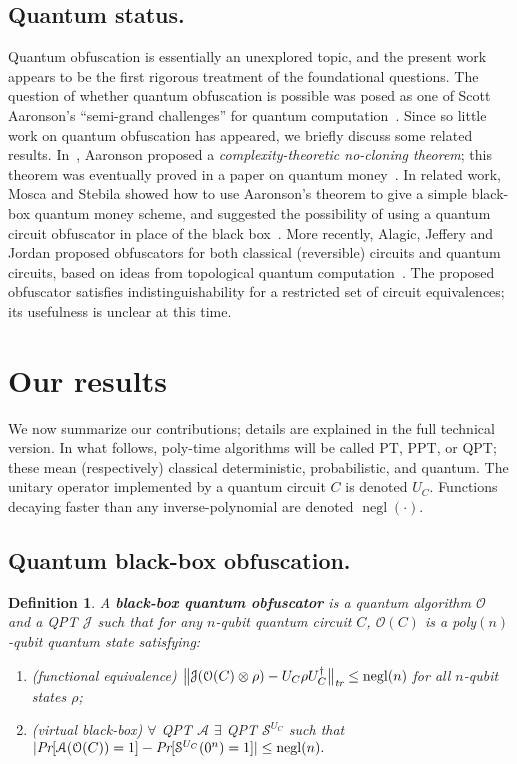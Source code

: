 \documentclass[11pt]{amsart}
\numberwithin{equation}{section}
\newtheorem{definition}{Definition}
\newcommand{\opn}{\operatorname}
\newcommand{\algo}{\mathcal}
\newcommand{\negl}{\opn{negl}}
\begin{document}
\subsection{Quantum status.} Quantum obfuscation is essentially an unexplored topic, and the present work appears to be the first rigorous treatment of the foundational questions. The question of whether quantum obfuscation is possible was posed as one of Scott Aaronson's ``semi-grand challenges'' for quantum computation~\cite{Aar05}. Since so little work on quantum obfuscation has appeared, we briefly discuss some related results. In~\cite{Aar09}, Aaronson proposed a \emph{complexity-theoretic no-cloning theorem}; this theorem was eventually proved in a paper on quantum money~\cite{AC12}. In related work, Mosca and Stebila showed how to use Aaronson's theorem to give a simple black-box quantum money scheme, and suggested the possibility of using a quantum circuit obfuscator in place of the black box~\cite{MS10}. More recently, Alagic, Jeffery and Jordan proposed obfuscators for both classical (reversible) circuits and quantum circuits, based on ideas from topological quantum computation~\cite{ASS14}. The proposed obfuscator satisfies indistinguishability for a restricted set of circuit equivalences; its usefulness is unclear at this time.

\section{Our results}\label{sec:intro}

We now summarize our contributions; details are explained in the full technical version. In what follows, poly-time algorithms will be called PT, PPT, or QPT; these mean (respectively) classical deterministic, probabilistic, and quantum. The unitary operator implemented by a quantum circuit $C$ is denoted $U_C$. Functions decaying faster than any inverse-polynomial are denoted $\negl(\cdot)$.

\subsection{Quantum black-box obfuscation.} 

\begin{definition}\label{def:vbb-obfuscator}
A \textbf{black-box quantum obfuscator} is a quantum algorithm $\algo O$ and a QPT $\algo J$ such that for any $n$-qubit quantum circuit $C$, $\mathcal O(C)$ is a poly$(n)$-qubit quantum state satisfying:
\begin{enumerate}
\item (functional equivalence) $\bigl\| \algo J ( \algo O(C) \otimes \rho ) - U_C \rho U_C^\dagger \bigr\|_\emph{tr} \leq \negl(n)$ for all $n$-qubit states $\rho$;
\item (virtual black-box) $\forall$ QPT $\mathcal A$ $\exists$ QPT $\mathcal S^{U_C}$ such that
$| \emph{Pr}[\mathcal A(\mathcal O(C)) = 1] - \emph{Pr}[\mathcal S^{U_C}(0^n) = 1]| \leq \negl(n).$
\end{enumerate}
\end{definition}
\end{document}
